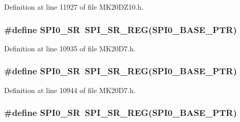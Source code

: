 Definition at line 11927 of file M\+K20\+D\+Z10.\+h.

\subsubsection[{\texorpdfstring{S\+P\+I0\+\_\+\+SR}{SPI0_SR}}]{\setlength{\rightskip}{0pt plus 5cm}\#define S\+P\+I0\+\_\+\+SR~{\bf S\+P\+I\+\_\+\+S\+R\+\_\+\+R\+EG}({\bf S\+P\+I0\+\_\+\+B\+A\+S\+E\+\_\+\+P\+TR})}\hypertarget{group___s_p_i___register___accessor___macros_ga2461be1ade1e6f4c9332082078af0447}{}\label{group___s_p_i___register___accessor___macros_ga2461be1ade1e6f4c9332082078af0447}


Definition at line 10935 of file M\+K20\+D7.\+h.

\subsubsection[{\texorpdfstring{S\+P\+I0\+\_\+\+SR}{SPI0_SR}}]{\setlength{\rightskip}{0pt plus 5cm}\#define S\+P\+I0\+\_\+\+SR~{\bf S\+P\+I\+\_\+\+S\+R\+\_\+\+R\+EG}({\bf S\+P\+I0\+\_\+\+B\+A\+S\+E\+\_\+\+P\+TR})}\hypertarget{group___s_p_i___register___accessor___macros_ga2461be1ade1e6f4c9332082078af0447}{}\label{group___s_p_i___register___accessor___macros_ga2461be1ade1e6f4c9332082078af0447}


Definition at line 10944 of file M\+K20\+D7.\+h.

\subsubsection[{\texorpdfstring{S\+P\+I0\+\_\+\+SR}{SPI0_SR}}]{\setlength{\rightskip}{0pt plus 5cm}\#define S\+P\+I0\+\_\+\+SR~{\bf S\+P\+I\+\_\+\+S\+R\+\_\+\+R\+EG}({\bf S\+P\+I0\+\_\+\+B\+A\+S\+E\+\_\+\+P\+TR})}\hypertarget{group___s_p_i___register___accessor___macros_ga2461be1ade1e6f4c9332082078af0447}{}\label{group___s_p_i___register___accessor___macros_ga2461be1ade1e6f4c9332082078af0447}


